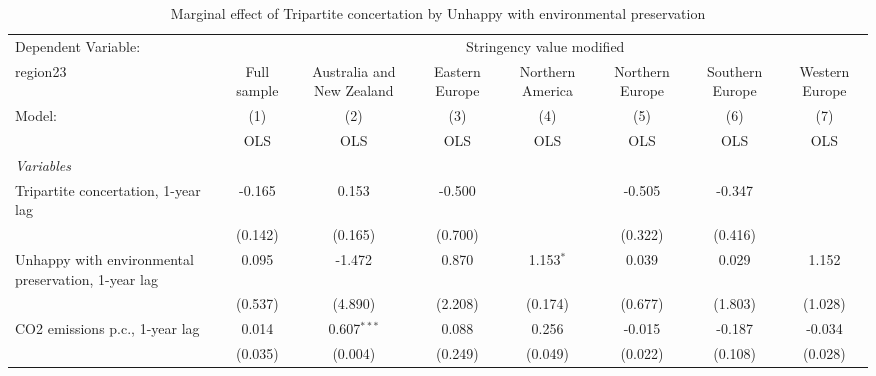 
\begin{table}[htbp]
   \caption{Marginal effect of Tripartite concertation by Unhappy with environmental preservation}
   \centering
   \begin{tabular}{lccccccc}
      \toprule
      Dependent Variable: & \multicolumn{7}{c}{Stringency value modified}\\
      region23                                                                                  & Full sample   & Australia and New Zealand & Eastern Europe & Northern America & Northern Europe & Southern Europe & Western Europe \\   
      Model:                                                                                    & (1)           & (2)                       & (3)            & (4)              & (5)             & (6)             & (7)\\  
                                                                                                &  OLS          & OLS                       & OLS            & OLS              & OLS             & OLS             & OLS\\  
      \midrule
      \emph{Variables}\\
      Tripartite concertation, 1-year lag                                                       & -0.165        & 0.153                     & -0.500         &                  & -0.505          & -0.347          &   \\   
                                                                                                & (0.142)       & (0.165)                   & (0.700)        &                  & (0.322)         & (0.416)         &   \\   
      Unhappy with environmental preservation, 1-year lag                                       & 0.095         & -1.472                    & 0.870          & 1.153$^{*}$      & 0.039           & 0.029           & 1.152\\   
                                                                                                & (0.537)       & (4.890)                   & (2.208)        & (0.174)          & (0.677)         & (1.803)         & (1.028)\\   
      CO2 emissions p.c., 1-year lag                                                            & 0.014         & 0.607$^{***}$             & 0.088          & 0.256            & -0.015          & -0.187          & -0.034\\   
                                                                                                & (0.035)       & (0.004)                   & (0.249)        & (0.049)          & (0.022)         & (0.108)         & (0.028)\\   

\end{tabular}
\end{table}
